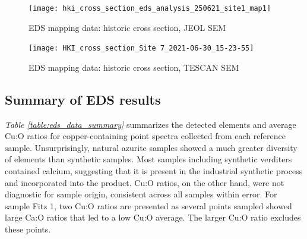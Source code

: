 \begin{figure}[H]
\centering
  \texttt{[image: hki\_cross\_section\_eds\_analysis\_250621\_site1\_map1]}
\caption[EDS mapping data: historic cross section, JEOL SEM]{EDS mapping data: historic cross section, JEOL SEM}
\label{fig:xsection_map1}
\end{figure}

\begin{figure}[H]
\centering
  \texttt{[image: HKI\_cross\_section\_Site 7\_2021-06-30\_15-23-55]}
\caption[EDS mapping data: historic cross section, TESCAN SEM]{EDS mapping data: historic cross section, TESCAN SEM}
\label{fig:xsection_map2}
\end{figure}

\subsection[Summary of EDS results]{Summary of EDS results}

\textit{Table \ref{table:eds_data_summary}} summarizes the detected elements and average Cu:O ratios for copper-containing point spectra collected from each reference sample. Unsurprisingly, natural azurite samples showed a much greater diversity of elements than synthetic samples. Most samples including synthetic verditers contained calcium, suggesting that it is present in the industrial synthetic process and incorporated into the product. Cu:O ratios, on the other hand, were not diagnostic for sample origin, consistent across all samples within error. For sample Fitz 1, two Cu:O ratios are presented as several points sampled showed large Ca:O ratios that led to a low Cu:O average. The larger Cu:O ratio excludes these points.

